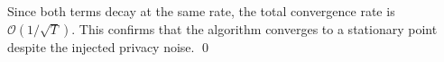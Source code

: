 \documentclass{article}
\theoremstyle{plain}
\theoremstyle{definition}
\newtheorem{definition}[theorem]{Definition}
\theoremstyle{remark}
\begin{document}
Since both terms decay at the same rate, the total convergence rate is $\mathcal{O}(1/\sqrt{T})$. This confirms that the algorithm converges to a stationary point despite the injected privacy noise.
\qed



\end{document}
